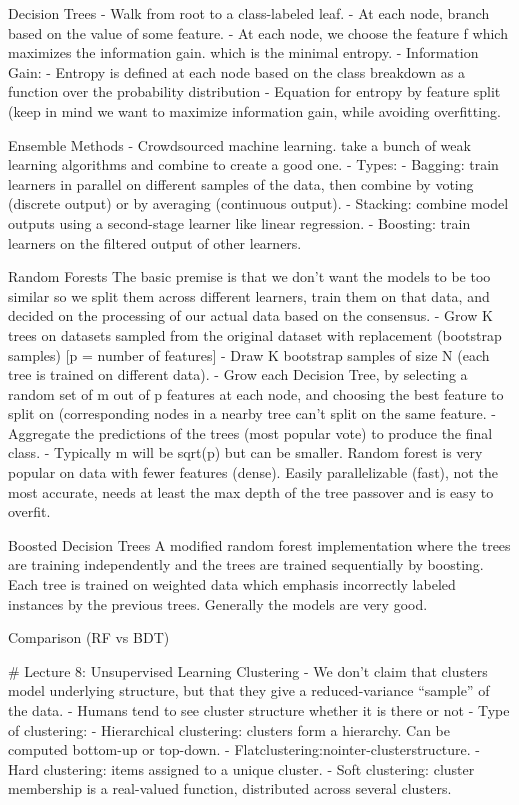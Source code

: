 \documentclass[3pt,landscape]{article}
\begin{document}
\begin{multicols}{3}
Decision Trees
- Walk from root to a class-labeled leaf.
- At each node, branch based on the value of some feature. 
- At each node, we choose the feature f which maximizes the information gain. which is the minimal entropy.
- Information Gain:
  - Entropy is defined at each node based on the class breakdown as a function over the probability distribution 
  - Equation for entropy by feature split (keep in mind we want to maximize information gain, while avoiding overfitting. 


Ensemble Methods 
- Crowdsourced machine learning. take a bunch of weak learning algorithms and combine to create a good one. 
- Types:
  - Bagging: train learners in parallel on different samples of the data, then combine by voting (discrete output) or by averaging (continuous output).
  - Stacking: combine model outputs using a second-stage learner like linear regression.
  - Boosting: train learners on the filtered output of other learners. 

Random Forests
The basic premise is that we don’t want the models to be too similar so we split them across different learners, train them on that data, and decided on the processing of our actual data based on the consensus. 
- Grow K trees on datasets sampled from the original dataset with replacement (bootstrap samples) [p = number of features]
- Draw K bootstrap samples of size N (each tree is trained on different data).
- Grow each Decision Tree, by selecting a random set of m out of p features at each node, and choosing the best feature to split on (corresponding nodes in a nearby tree can’t split on the same feature. 
- Aggregate the predictions of the trees (most popular vote) to produce the final class.
- Typically m will be sqrt(p) but can be smaller. 
Random forest is very popular on data with fewer features (dense). Easily parallelizable (fast), not the most accurate, needs at least the max depth of the tree passover and is easy to overfit. 

Boosted Decision Trees
A modified random forest implementation where the trees are training independently and the trees are trained sequentially by boosting. Each tree is trained on weighted data which emphasis incorrectly labeled instances by the previous trees. Generally the models are very good.

Comparison (RF vs BDT)

\# Lecture 8: Unsupervised Learning
Clustering
- We don’t claim that clusters model underlying structure, but that they give a reduced-variance “sample” of the data.
- Humans tend to see cluster structure whether it is there or not 
-  Type of clustering:
  - Hierarchical clustering: clusters form a hierarchy. Can be computed bottom-up or top-down.
  - Flatclustering:nointer-clusterstructure.
  - Hard clustering: items assigned to a unique cluster.
  - Soft clustering: cluster membership is a real-valued function, distributed across several clusters. 



\end{multicols}
\end{document}
